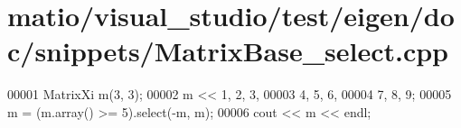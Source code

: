 \hypertarget{matio_2visual__studio_2test_2eigen_2doc_2snippets_2_matrix_base__select_8cpp_source}{}\section{matio/visual\+\_\+studio/test/eigen/doc/snippets/\+Matrix\+Base\+\_\+select.cpp}
\label{matio_2visual__studio_2test_2eigen_2doc_2snippets_2_matrix_base__select_8cpp_source}

\begin{DoxyCode}
00001 MatrixXi m(3, 3);
00002 m << 1, 2, 3,
00003      4, 5, 6,
00004      7, 8, 9;
00005 m = (m.array() >= 5).select(-m, m);
00006 cout << m << endl;
\end{DoxyCode}
